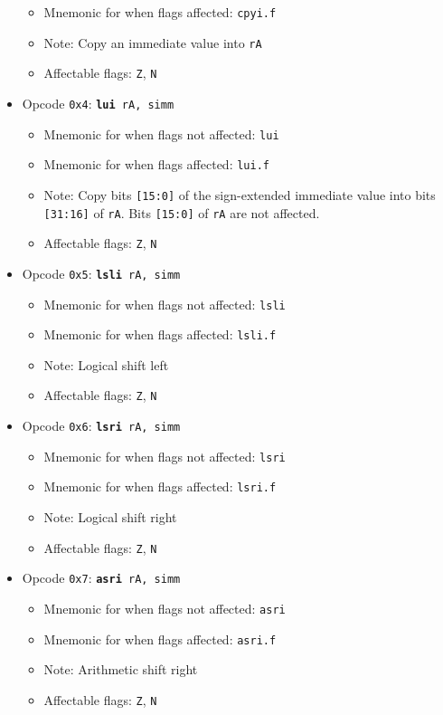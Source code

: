 \documentclass{article}
\begin{document}
\begin{itemize}
\begin{itemize}
			\item Mnemonic for when flags affected:  \texttt{cpyi.f}
			\item Note:  Copy an immediate value into \texttt{rA}
			\item Affectable flags:
				\texttt{Z}, \texttt{N}
		\end{itemize}
		\item Opcode \texttt{0x4}:
			\texttt{\textbf{lui} rA, simm}
		\begin{itemize}
			\item Mnemonic for when flags not affected:  \texttt{lui}
			\item Mnemonic for when flags affected:  \texttt{lui.f}
			\item Note:  Copy bits \texttt{[15:0]} of the sign-extended
			immediate value into bits \texttt{[31:16]} of \texttt{rA}.
			Bits \texttt{[15:0]} of \texttt{rA} are not affected.
			\item Affectable flags:
				\texttt{Z}, \texttt{N}
		\end{itemize}
		\item Opcode \texttt{0x5}:
			\texttt{\textbf{lsli} rA, simm}
		\begin{itemize}
			\item Mnemonic for when flags not affected:  \texttt{lsli}
			\item Mnemonic for when flags affected:  \texttt{lsli.f}
			\item Note:  Logical shift left
			\item Affectable flags:
				\texttt{Z}, \texttt{N}
		\end{itemize}
		\item Opcode \texttt{0x6}:
			\texttt{\textbf{lsri} rA, simm}
		\begin{itemize}
			\item Mnemonic for when flags not affected:  \texttt{lsri}
			\item Mnemonic for when flags affected:  \texttt{lsri.f}
			\item Note:  Logical shift right
			\item Affectable flags:
				\texttt{Z}, \texttt{N}
		\end{itemize}
		\item Opcode \texttt{0x7}:
			\texttt{\textbf{asri} rA, simm}
		\begin{itemize}
			\item Mnemonic for when flags not affected:  \texttt{asri}
			\item Mnemonic for when flags affected:  \texttt{asri.f}
			\item Note:  Arithmetic shift right
			\item Affectable flags:
				\texttt{Z}, \texttt{N}
		\end{itemize}
	\end{itemize}
\end{document}
